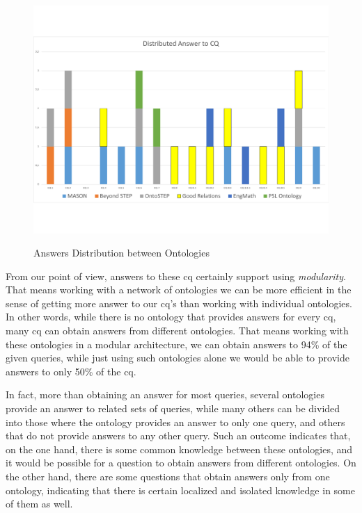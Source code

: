 \begin{figure}
	\begin{center}
		\includegraphics[scale=0.5]{figure-chapterIV/fig4-7}\\
		\caption{Answers Distribution between Ontologies}
		\label{figure4-7}
	\end{center}
\end{figure}



From our point of view, answers to these \gls{cq} certainly support using \textit{modularity}. That means working with a network of ontologies we can be more efficient in the sense of getting more answer to our \gls{cq}'s than working with individual ontologies. In other words, while there is no ontology that provides answers for every \gls{cq}, many \gls{cq} can obtain answers from different ontologies. That means working with these ontologies in a modular architecture, we can obtain answers to 94\% of the given queries, while just using such ontologies alone we would be able to provide answers to only 50\% of the \gls{cq}. 

In fact, more than obtaining an answer for most queries, several ontologies provide an answer to related sets of queries, while many others can be divided into those where the ontology provides an answer to only one query, and others that do not provide answers to any other query.  Such an outcome indicates that, on  the one hand, there is some common knowledge between these ontologies, and it would be possible for a question to obtain answers from different ontologies. On the other hand, there are some questions that obtain answers only from one ontology, indicating that there is certain localized and isolated knowledge in some of them as well. 


